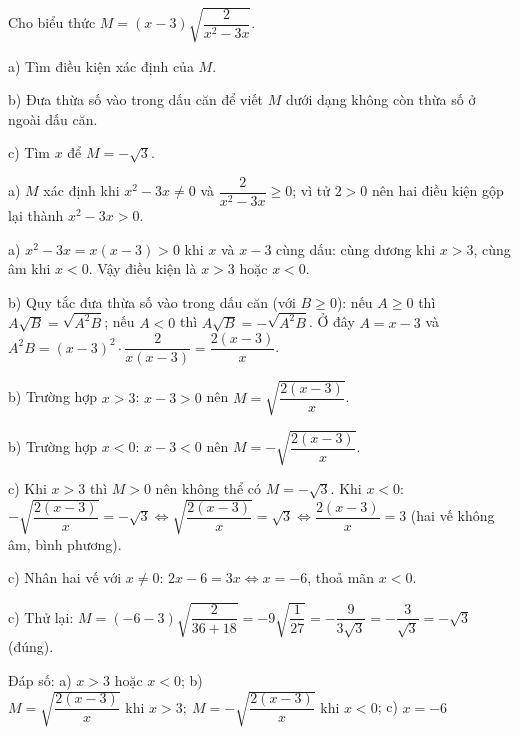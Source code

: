 \begin{problem}[9DS-CAN-025]
Cho biểu thức $M = (x - 3)\sqrt{\dfrac{2}{x^2 - 3x}}$.

a) Tìm điều kiện xác định của $M$.

b) Đưa thừa số vào trong dấu căn để viết $M$ dưới dạng không còn thừa số ở ngoài dấu căn.

c) Tìm $x$ để $M = -\sqrt{3}$.

\begin{solution}
a) $M$ xác định khi $x^2 - 3x \neq 0$ và $\dfrac{2}{x^2 - 3x} \geq 0$; vì tử $2 > 0$ nên hai điều kiện gộp lại thành $x^2 - 3x > 0$.

a) $x^2 - 3x = x(x - 3) > 0$ khi $x$ và $x - 3$ cùng dấu: cùng dương khi $x > 3$, cùng âm khi $x < 0$. Vậy điều kiện là $x > 3$ hoặc $x < 0$.

b) Quy tắc đưa thừa số vào trong dấu căn (với $B \geq 0$): nếu $A \geq 0$ thì $A\sqrt{B} = \sqrt{A^2B}$; nếu $A < 0$ thì $A\sqrt{B} = -\sqrt{A^2B}$. Ở đây $A = x - 3$ và $A^2B = (x - 3)^2 \cdot \dfrac{2}{x(x - 3)} = \dfrac{2(x - 3)}{x}$.

b) Trường hợp $x > 3$: $x - 3 > 0$ nên $M = \sqrt{\dfrac{2(x - 3)}{x}}$.

b) Trường hợp $x < 0$: $x - 3 < 0$ nên $M = -\sqrt{\dfrac{2(x - 3)}{x}}$.

c) Khi $x > 3$ thì $M > 0$ nên không thể có $M = -\sqrt{3}$. Khi $x < 0$: $-\sqrt{\dfrac{2(x - 3)}{x}} = -\sqrt{3} \Leftrightarrow \sqrt{\dfrac{2(x - 3)}{x}} = \sqrt{3} \Leftrightarrow \dfrac{2(x - 3)}{x} = 3$ (hai vế không âm, bình phương).

c) Nhân hai vế với $x \neq 0$: $2x - 6 = 3x \Leftrightarrow x = -6$, thoả mãn $x < 0$.

c) Thử lại: $M = (-6 - 3)\sqrt{\dfrac{2}{36 + 18}} = -9\sqrt{\dfrac{1}{27}} = -\dfrac{9}{3\sqrt{3}} = -\dfrac{3}{\sqrt{3}} = -\sqrt{3}$ (đúng).

Đáp số: a) $\boxed{x > 3 \text{ hoặc } x < 0}$; b) $\boxed{M = \sqrt{\dfrac{2(x - 3)}{x}} \text{ khi } x > 3;\ M = -\sqrt{\dfrac{2(x - 3)}{x}} \text{ khi } x < 0}$; c) $\boxed{x = -6}$
\end{solution}
\end{problem}

